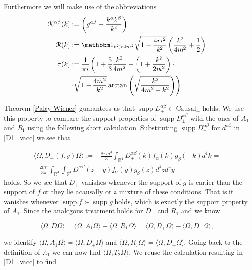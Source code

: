 \documentclass[b5paper,draft,openbib,12pt]{memoir}
\DeclareMathOperator{\supp}{supp}
\newcommand{\id}{{\mathbbm 1}}
\begin{document}
Furthermore we will make use of the abbreviations 
\begin{align}
\mathcal{K}^{\alpha \beta} (k) &:=  \left(g^{\alpha \beta}  - \frac{k^{\alpha} k^{\beta}}{k^2}\right) \\
\mathcal{R}(k) &:= \id_{k^2>4m^2} \sqrt{1-  \frac{4m^2}{k^2}} \left( \frac{k^2}{4m^2}+\frac{1}{2}\right)\\\notag
\tau (k) &:=\frac{1}{\pi i}\left( 1 +\frac{5}{3} \frac{k^2}{4m^2}-\left(1+ \frac{k^2} {2m^2}\right) \cdot \right.\\
 &\left.  \cdot \sqrt{1-\frac{4m^2}{k^2}}\arctan \left( \sqrt{\frac{k^2}{4m^2-k^2}} \right)\right)_.
\end{align}

Theorem \ref{Paley-Wiener} guarantees 
us that \(\supp D^{\alpha \beta}_{\pm}\subset \text{Causal}_{\pm}\) holds. We use this property to compare the support properties of
 \(\supp D^{\alpha \beta}_{\pm}\) with the ones of \(A_1\) and \(R_1\) using the following short calculation: Substituting 
 \(\supp D^{\alpha \beta}_{+}\) for \(d^{\alpha \beta}\) in \eqref{D1_vacc} we see that

\begin{multline}\label{D+translation}
\langle \Omega, D_+ (f,g)\Omega \rangle :=-\frac{8 \pi m^4}{3} \int_{\mathbb{R}^4} D^{\alpha \beta}_{+}(k) f_\alpha (k) g_\beta (-k) d^4 k=\\
- \frac{2 m^4}{3 \pi} \int_{\mathbb{R}^4} \int_{\mathbb{R}^4} D^{\alpha \beta} (z-y) f_\alpha (y) g_\beta (z) d^4 z d^4 y
\end{multline}
holds. So we see that \(D_+\) vanishes whenever the support of \(g\) is earlier than the support of \(f\) or they lie 
acausally or a mixture of these conditions. That is it vanishes whenever \(\supp f\succ \supp g\) holds, which 
is exactly the support property of \(A_1\).  Since the analogous treatment holds for \(D_-\) and \(R_1\) and we 
know 

\begin{equation*}
\langle \Omega, D\Omega \rangle=\langle \Omega,A_1\Omega \rangle-\langle \Omega,R_1\Omega \rangle=\langle \Omega,D_+\Omega \rangle - \langle \Omega,D_-\Omega \rangle,
\end{equation*}

we identify \(\langle \Omega,A_1\Omega \rangle=\langle \Omega,D_+\Omega \rangle\) and 
\(\langle \Omega,R_1\Omega \rangle=\langle \Omega,D_-\Omega \rangle\). Going back to the definition 
of \(A_1\) we can now find \(\langle \Omega, T_2 \Omega \rangle \). We reuse the calculation resulting 
in \eqref{D1_vacc} to find
\end{document}
